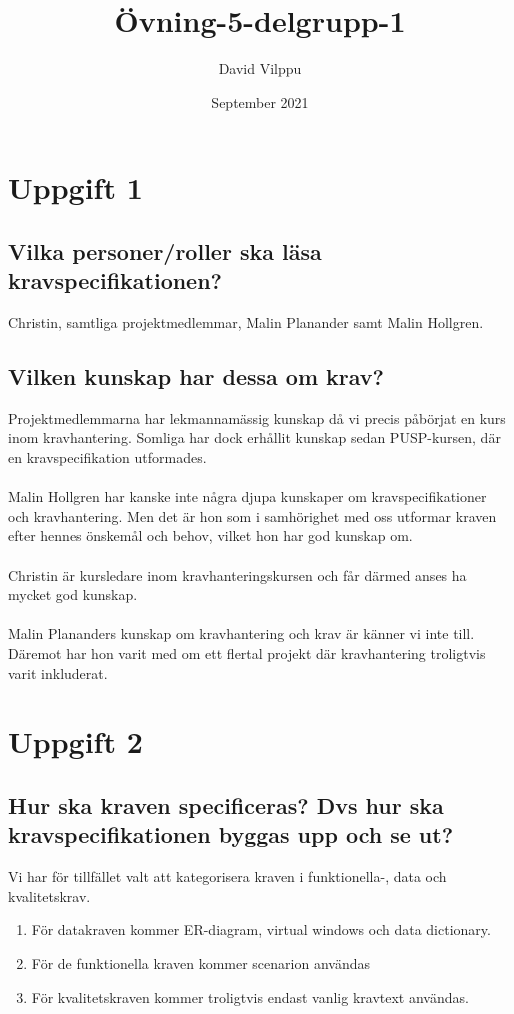 \documentclass{article}
\title{Övning-5-delgrupp-1}
\author{David Vilppu}
\date{September 2021}
\begin{document}
\maketitle

\section*{Uppgift 1}
\subsection*{Vilka personer/roller ska läsa kravspecifikationen?}
Christin, samtliga projektmedlemmar, Malin Planander samt Malin Hollgren.
\subsection*{Vilken kunskap har dessa om krav?}
Projektmedlemmarna har lekmannamässig kunskap då vi precis påbörjat en kurs inom kravhantering. Somliga har dock erhållit kunskap sedan PUSP-kursen, där en kravspecifikation utformades.\\\\
Malin Hollgren har kanske inte några djupa kunskaper om kravspecifikationer och kravhantering. Men det är hon som i samhörighet med oss utformar kraven efter hennes önskemål och behov, vilket hon har god kunskap om. \\\\
Christin är kursledare inom kravhanteringskursen och får därmed anses ha mycket god kunskap. \\\\
Malin Plananders kunskap om kravhantering och krav är känner vi inte till. Däremot har hon varit med om ett flertal projekt där kravhantering troligtvis varit inkluderat.

\section*{Uppgift 2}
\subsection*{Hur ska kraven specificeras? Dvs hur ska kravspecifikationen byggas upp och se ut?}
Vi har för tillfället valt att kategorisera kraven i funktionella-, data och kvalitetskrav.
\begin{enumerate}
    \item För datakraven kommer ER-diagram, virtual windows och data dictionary.
    \item För de funktionella kraven kommer scenarion användas
    \item För kvalitetskraven kommer troligtvis endast vanlig kravtext användas.
\end{enumerate}
\end{document}
